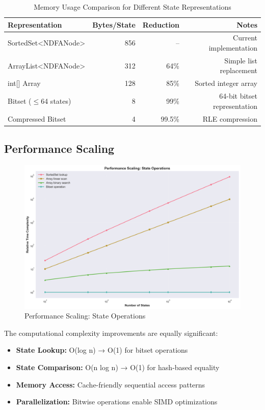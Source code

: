 \documentclass[11pt,a4paper]{article}
\begin{document}
\begin{table}[H]
\centering
\begin{tabular}{@{}lrrr@{}}
\toprule
\textbf{Representation} & \textbf{Bytes/State} & \textbf{Reduction} & \textbf{Notes} \\
\midrule
SortedSet<NDFANode> & 856 & -- & Current implementation \\
ArrayList<NDFANode> & 312 & 64\% & Simple list replacement \\
int[] Array & 128 & 85\% & Sorted integer array \\
Bitset ($\leq$64 states) & 8 & 99\% & 64-bit bitset representation \\
Compressed Bitset & 4 & 99.5\% & RLE compression \\
\bottomrule
\end{tabular}
\caption{Memory Usage Comparison for Different State Representations}
\label{tab:memory}
\end{table}

\subsection{Performance Scaling}

\begin{figure}[H]
\centering
\includegraphics[width=\textwidth]{illustrations/performance_scaling.png}
\caption{Performance Scaling: State Operations}
\label{fig:performance_scaling}
\end{figure}

The computational complexity improvements are equally significant:

\begin{itemize}
    \item \textbf{State Lookup:} O(log n) → O(1) for bitset operations
    \item \textbf{State Comparison:} O(n log n) → O(1) for hash-based equality
    \item \textbf{Memory Access:} Cache-friendly sequential access patterns
    \item \textbf{Parallelization:} Bitwise operations enable SIMD optimizations
\end{itemize}
\end{document}
